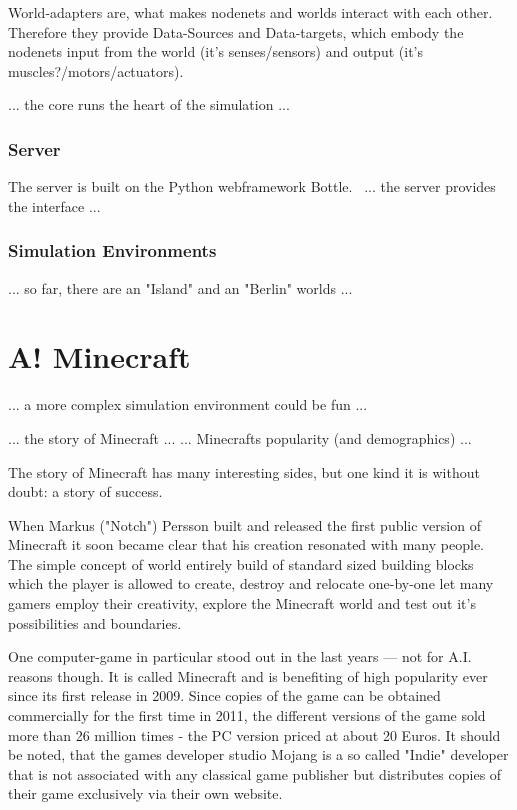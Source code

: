 World-adapters are, what makes nodenets and worlds interact with each other. Therefore they provide Data-Sources and Data-targets, which embody the nodenets input from the world (it's senses/sensors) and output (it's muscles?/motors/actuators).

... the core runs the heart of the simulation ...

            \subsubsection{Server}
The server is built on the Python webframework Bottle.~\cite{conf/agi/Bach12}
... the server provides the interface ...

            \subsubsection{Simulation Environments}
... so far, there are an "Island" and an "Berlin" worlds ...

    \section{A! Minecraft}
... a more complex simulation environment could be fun ...

... the story of Minecraft ...
... Minecrafts popularity (and demographics) ...

The story of Minecraft has many interesting sides, but one kind it is without doubt: a story of success.

When Markus ("Notch") Persson built and released the first public version of Minecraft it soon became clear that his creation resonated with many people. The simple concept of world entirely build of standard sized building blocks which the player is allowed to create, destroy and relocate one-by-one let many gamers employ their creativity, explore the Minecraft world and test out it's possibilities and boundaries.

One computer-game in particular stood out in the last years --- not for A.I. reasons though. It is called Minecraft and is benefiting of high popularity ever since its first release in 2009. Since copies of the game can be obtained commercially for the first time in 2011, the different versions of the game sold more than 26 million times - the PC version priced at about 20 Euros. It should be noted, that the games developer studio Mojang is a so called "Indie" developer that is not associated with any classical game publisher but distributes copies of their game exclusively via their own website.

